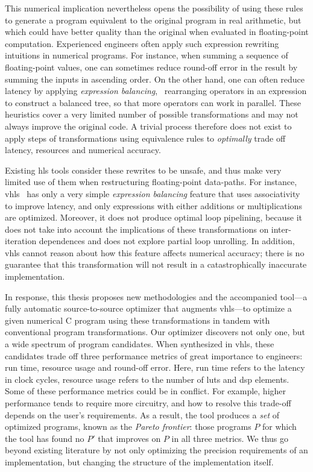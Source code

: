 This numerical implication nevertheless opens the possibility of using
these rules to generate a program equivalent to the original program in
real arithmetic, but which could have better quality than the original when
evaluated in floating-point computation.  Experienced engineers often apply
such expression rewriting intuitions in numerical programs.  For instance,
when summing a sequence of floating-point values, one can sometimes reduce
round-off error in the result by summing the inputs in ascending order.  On
the other hand, one can often reduce latency by applying \emph{expression
balancing}, \ie~rearranging operators in an expression to construct a balanced
tree, so that more operators can work in parallel.  These heuristics cover a
very limited number of possible transformations and may not always improve the
original code.  A trivial process therefore does not exist to apply steps of
transformations using equivalence rules to \emph{optimally} trade off latency,
resources and numerical accuracy.

Existing \gls{hls} tools consider these rewrites to be unsafe, and thus make
very limited use of them when restructuring floating-point data-paths.  For
instance, \gls{vhls}~\cite{vivado_hls} has only a very simple \emph{expression
balancing} feature that uses associativity to improve latency, and only
expressions with either additions or multiplications are optimized.  Moreover,
it does not produce optimal loop pipelining, because it does not take
into account the implications of these transformations on inter-iteration
dependences and does not explore partial loop unrolling.  In addition,
\gls{vhls} cannot reason about how this feature affects numerical accuracy;
there is no guarantee that this transformation will not result in a
catastrophically inaccurate implementation.

In response, this thesis proposes new methodologies and the accompanied
tool---a fully automatic source-to-source optimizer that augments
\gls{vhls}---to optimize a given numerical C program using these
transformations in tandem with conventional program transformations.  Our
optimizer discovers not only one, but a wide spectrum of program candidates.
When synthesized in \gls{vhls}, these candidates trade off three performance
metrics of great importance to engineers: run time, resource usage and
round-off error.  Here, run time refers to the latency in clock cycles,
resource usage refers to the number of \glspl{lut} and \gls{dsp} elements.
Some of these performance metrics could be in conflict.  For example, higher
performance tends to require more circuitry, and how to resolve this trade-off
depends on the user's requirements.  As a result, the tool produces a
\emph{set} of optimized programs, known as the \emph{Pareto frontier}: those
programs $P$ for which the tool has found no $P'$ that improves on $P$ in all
three metrics.  We thus go beyond existing literature by not only optimizing
the precision requirements of an implementation, but changing the structure of
the implementation itself.

